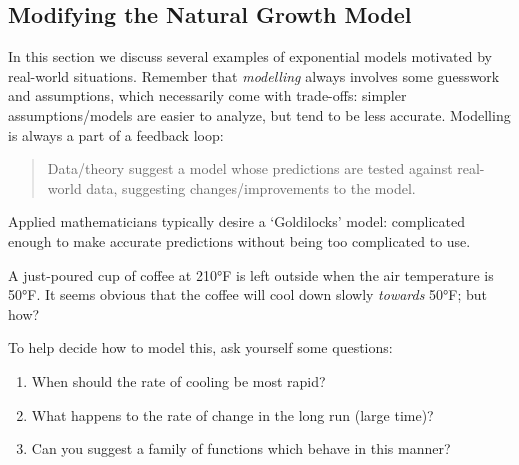 \clearpage


\subsection{Modifying the Natural Growth Model}

In this section we discuss several examples of exponential models motivated by real-world situations. Remember that \emph{modelling} always involves some guesswork and assumptions, which necessarily come with trade-offs: simpler assumptions/models are easier to analyze, but tend to be less accurate. Modelling is always a part of a feedback loop:
\begin{quote}
	Data/theory suggest a model whose predictions are tested against real-world data, suggesting changes/improvements to the model.
\end{quote}
Applied mathematicians typically desire a `Goldilocks' model: complicated enough to make accurate predictions without being too complicated to use.



A just-poured cup of coffee at \ang{210}F is left outside when the air temperature is \ang{50}F. It seems obvious that the coffee will cool down slowly \emph{towards} \ang{50}F; but how?\smallbreak

To help decide how to model this, ask yourself some questions:

\begin{enumerate}
  \item When should the rate of cooling be most rapid?
  \item What happens to the rate of change in the long run (large time)?
  \item Can you suggest a family of functions which behave in this manner?
\end{enumerate}


